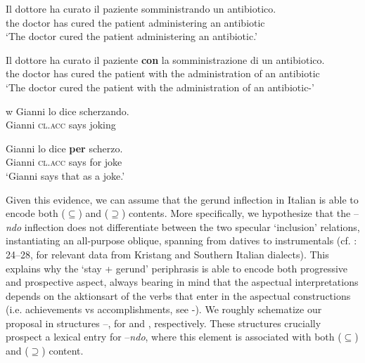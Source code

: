 \documentclass[output=paper,modfonts,nonflat,newtxmath,colorlinks,citecolor=brown]{langsci/langscibook}
\begin{document}
\ea%
    \label{ex:franco:28}
    \ea \label{ex:franco:28a}
    \gll  Il dottore ha curato il paziente somministrando un antibiotico.\\
        the doctor has cured the patient administering an antibiotic\\
    \glt ‘The doctor cured the patient administering an antibiotic.’
    
     \ex \label{ex:franco:28b}
    \gll Il dottore ha curato il paziente \textbf{con} la somministrazione di un antibiotico.\\
        the doctor has cured the patient with the administration of an antibiotic\\
    \glt ‘The doctor cured the patient with the administration of an antibiotic-’
    \z
    \z


w
\ea%
\label{ex:franco:29}
    \ea \label{ex:franco:29a}
    \gll  Gianni lo dice scherzando.\\
        Gianni \textsc{cl.acc} says joking\\
    \glt
    
     \ex \label{ex:franco:29b}
    \gll  Gianni lo dice \textbf{per} scherzo.\\
        Gianni \textsc{cl.acc} says for joke\\
    \glt `Gianni says that as a joke.'
    \z
    \z 

Given this evidence, we can assume that the gerund inflection in Italian is able to encode both (${\subseteq}$) and (${\supseteq}$) contents. More specifically, we hypothesize that the –\textit{ndo} inflection does not differentiate between the two specular ‘inclusion’ relations, instantiating an all-purpose oblique, spanning from datives to instrumentals (cf. \citealt{FrancoManzini2017}: 24--28, for relevant data from Kristang and Southern Italian dialects). This explains why the ‘stay + gerund’ periphrasis is able to encode both progressive and prospective aspect, always bearing in mind that the aspectual interpretations depends on the {aktionsart} of the verbs that enter in the aspectual constructions (i.e. achievements vs accomplishments, see -). We roughly schematize our proposal in structures –, for  and , respectively. These structures crucially prospect a lexical entry for –\textit{ndo}, where this element is associated with both (${\subseteq}$) and (${\supseteq}$) content.

\ea%
    \label{ex:franco:30}
    
\end{document}
